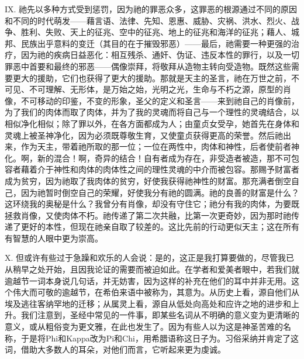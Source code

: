 IX. 祂先以多种方式受到惩罚，因为祂的罪恶众多，这罪恶的根源通过不同的原因和不同的时代萌发——藉言语、法律、先知、恩惠、威胁、灾祸、洪水、烈火、战争、胜利、失败、天上的征兆、空中的征兆、地上的征兆和海洋的征兆；藉人、城邦、民族出乎意料的变迁（其目的在于摧毁邪恶）——最后，祂需要一种更强的治疗，因为祂的疾病日益恶化：相互残杀、通奸、伪证、违反本性的罪行，以及一切罪恶中首要和最终的邪恶——偶像崇拜，将敬拜从造物主转向受造物。既然这些需要更大的援助，它们也获得了更大的援助。那就是天主的圣言，祂在万世之前，不可见、不可理解、无形体，是万始之始，光明之光，生命与不朽之源，原型的肖像，不可移动的印鉴，不变的形象，圣父的定义和圣言——来到祂自己的肖像前，为了我们的肉体而取了肉体，并为了我的灵魂而将自己与一个理性的灵魂结合，以相似净化相似；除了罪以外，在各方面都成为人；由童贞女受孕，她首先在身体和灵魂上被圣神净化，因为必须既尊敬生育，又使童贞获得更高的荣誉。然后祂出来，作为天主，带着祂所取的那一位；一位在两性中，肉体和神性，后者使前者神化。啊，新的混合！啊，奇异的结合！自有者成为存在，非受造者被造，那不可包容者藉着介于神性和肉体的肉体性之间的理性灵魂的中介而被包容。那赐予财富者成为贫穷，因为祂取了我肉体的贫穷，好使我获得祂神性的财富。那充满者倒空自己，因为祂暂时倒空自己的荣耀，好使我分有祂的圆满。祂的良善的财富是什么？这环绕我的奥秘是什么？我曾分有肖像，却没有守住它；祂分有我的肉体，为要既拯救肖像，又使肉体不朽。祂传递了第二次共融，比第一次更奇妙，因为那时祂传递了更好的本性，但现在祂亲自取了较差的。这比先前的行动更似天主；这在所有有智慧的人眼中更为崇高。\par

X. 但或许有些过于急躁和欢乐的人会说：是的，这正是我打算要做的，尽管我已从稍早之处开始，且因我论证的需要而被迫如此。在学者和爱美者眼中，若我们就逾越节一词本身说几句话，并无妨害，因为这样的补充在他们的耳中并非无用。这个伟大而可敬的逾越节，在希伯来语中被称为，其意为。从历史上看，源自他们从埃及逃往客纳罕地的迁移；从属灵上看，源自从低处向高处和应许之地的进步和上升。我们注意到，圣经中常见的一件事，即某些名词从不明确的意义变为更清晰的意义，或从粗俗变为更文雅，在此也发生了。因为有些人以为这是神圣苦难的名称，于是将Phi和Kappa改为Pi和Chi，用希腊语称这日子为。习俗采纳并肯定了这词，借助大多数人的耳朵，对他们而言，它听起来更为虔诚。\par

